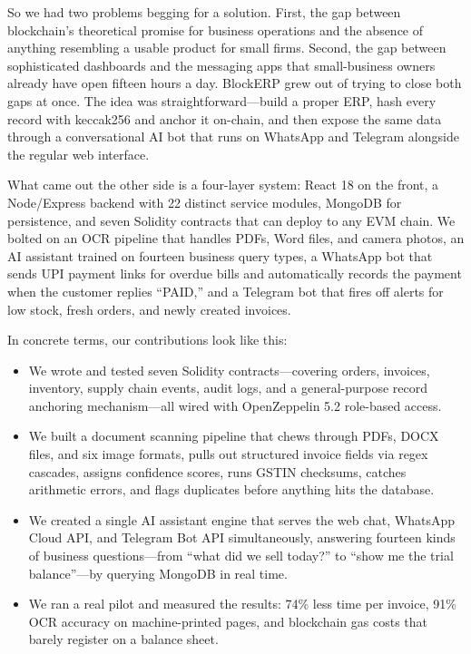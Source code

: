 \documentclass[conference]{IEEEtran}
\begin{document}
So we had two problems begging for a solution. First, the gap between blockchain's theoretical promise for business operations and the absence of anything resembling a usable product for small firms. Second, the gap between sophisticated dashboards and the messaging apps that small-business owners already have open fifteen hours a day. BlockERP grew out of trying to close both gaps at once. The idea was straightforward---build a proper ERP, hash every record with keccak256 and anchor it on-chain, and then expose the same data through a conversational AI bot that runs on WhatsApp and Telegram alongside the regular web interface.

What came out the other side is a four-layer system: React 18 on the front, a Node/Express backend with 22 distinct service modules, MongoDB for persistence, and seven Solidity contracts that can deploy to any EVM chain. We bolted on an OCR pipeline that handles PDFs, Word files, and camera photos, an AI assistant trained on fourteen business query types, a WhatsApp bot that sends UPI payment links for overdue bills and automatically records the payment when the customer replies ``PAID,'' and a Telegram bot that fires off alerts for low stock, fresh orders, and newly created invoices.

In concrete terms, our contributions look like this:
\begin{itemize}
    \item We wrote and tested seven Solidity contracts---covering orders, invoices, inventory, supply chain events, audit logs, and a general-purpose record anchoring mechanism---all wired with OpenZeppelin 5.2 role-based access.
    \item We built a document scanning pipeline that chews through PDFs, DOCX files, and six image formats, pulls out structured invoice fields via regex cascades, assigns confidence scores, runs GSTIN checksums, catches arithmetic errors, and flags duplicates before anything hits the database.
    \item We created a single AI assistant engine that serves the web chat, WhatsApp Cloud API, and Telegram Bot API simultaneously, answering fourteen kinds of business questions---from ``what did we sell today?'' to ``show me the trial balance''---by querying MongoDB in real time.
    \item We ran a real pilot and measured the results: 74\% less time per invoice, 91\% OCR accuracy on machine-printed pages, and blockchain gas costs that barely register on a balance sheet.
\end{itemize}
\end{document}
